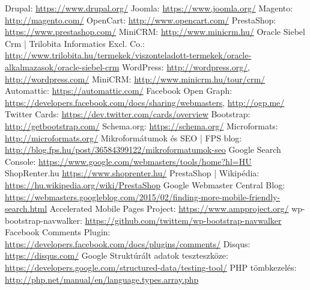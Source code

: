 \begin{thebibliography}{x}
	 Drupal: \url{https://www.drupal.org/}
	 Joomla: \url{https://www.joomla.org/}
	 Magento: \url{http://magento.com/}
	 OpenCart: \url{http://www.opencart.com/}
	 PrestaShop: \url{https://www.prestashop.com/}
	 MiniCRM: \url{http://www.minicrm.hu/}
	 Oracle Siebel Crm | Trilobita Informatics Excl. Co.: \url{http://www.trilobita.hu/termekek/viszonteladott-termekek/oracle-alkalmazasok/oracle-siebel-crm}
	 WordPress: \url{http://wordpress.org/}, \url{http://wordpress.com/}
	 MiniCRM: \url{http://www.minicrm.hu/tour/crm/}
	 Automattic: \url{https://automattic.com/}
	 Facebook Open Graph: \url{https://developers.facebook.com/docs/sharing/webmasters}, \url{http://ogp.me/}
	 Twitter Cards: \url{https://dev.twitter.com/cards/overview}
	 Bootstrap: \url{http://getbootstrap.com/}
	 Schema.org: \url{https://schema.org/}
	 Microformats: \url{http://microformats.org/}
	 Mikroformátumok és SEO | FPS blog: \url{http://blog.fps.hu/post/36584399122/mikroformatumok-seo}
	 Google Search Console: \url{https://www.google.com/webmasters/tools/home?hl=HU}
	 ShopRenter.hu \url{https://www.shoprenter.hu/}
	 PrestaShop | Wikipédia: \url{https://hu.wikipedia.org/wiki/PrestaShop}
	 Google Webmaster Central Blog: \url{https://webmasters.googleblog.com/2015/02/finding-more-mobile-friendly-search.html}
	 Accelerated Mobile Pages Project: \url{https://www.ampproject.org/}
	 wp-bootstrap-navwalker: \url{https://github.com/twittem/wp-bootstrap-navwalker}
	 Facebook Comments Plugin: \url{https://developers.facebook.com/docs/plugins/comments/}
	 Disqus: \url{https://disqus.com/}
	 Google Struktúrált adatok teszteszköze: \url{https://developers.google.com/structured-data/testing-tool/}
	 PHP tömbkezelés: \url{http://php.net/manual/en/language.types.array.php}
\end{thebibliography}